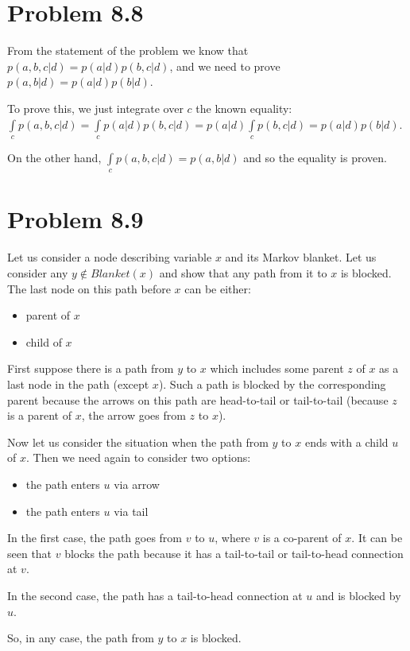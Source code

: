 \documentclass[fleqn]{article}
\begin{document}
\section*{Problem 8.8}

From the statement of the problem we know that $p(a,b,c|d) = p(a|d)p(b,c|d)$, and we need to prove $p(a,b|d) = p(a|d)p(b|d)$.

To prove this, we just integrate over $c$ the known equality: $\int\limits_{c}p(a,b,c|d) = \int\limits_{c}p(a|d)p(b,c|d) = p(a|d)\int\limits_{c}p(b,c|d) = p(a|d)p(b|d)$.

On the other hand, $\int\limits_{c}p(a,b,c|d) = p(a,b|d)$ and so the equality is proven. 

\section*{Problem 8.9}

Let us consider a node describing variable $x$ and its Markov blanket. Let us consider any $y \notin Blanket(x)$ and show that any path from it to $x$ is blocked. The last node on this path before $x$ can be either:
\begin{itemize}
	\item parent of $x$
	\item child of $x$
\end{itemize}

First suppose there is a path from $y$ to $x$ which includes some parent $z$ of $x$ as a last node in the path (except $x$). Such a path is blocked by the corresponding parent because the arrows on this path are head-to-tail or tail-to-tail (because $z$ is a parent of $x$, the arrow goes from $z$ to $x$).

Now let us consider the situation when the path from $y$ to $x$ ends with a child $u$ of $x$. Then we need again to consider two options:
\begin{itemize}
	\item the path enters $u$ via arrow
	\item the path enters $u$ via tail
\end{itemize}

In the first case, the path goes from $v$ to $u$, where $v$ is a co-parent of $x$. It can be seen that $v$ blocks the path because it has a tail-to-tail or tail-to-head connection at $v$.

In the second case, the path has a tail-to-head connection at $u$ and is blocked by $u$.

So, in any case, the path from $y$ to $x$ is blocked.
\end{document}
